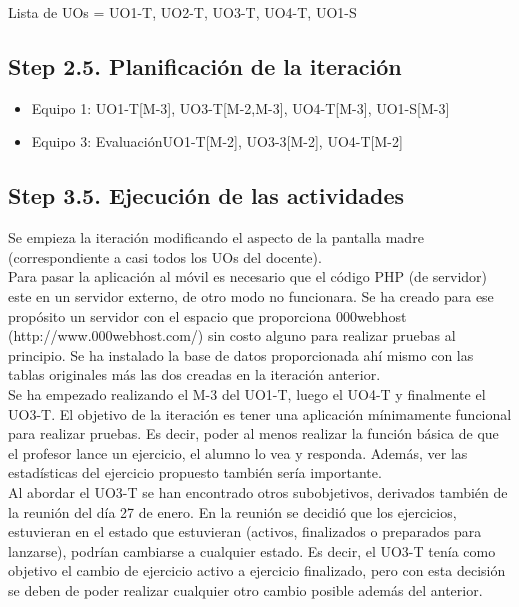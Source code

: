 Lista de UOs = {UO1-T, UO2-T, UO3-T, UO4-T, UO1-S}

\subsection{Step 2.5. Planificación de la iteración}
\label{it5:2.5}

\begin{itemize}
\item Equipo 1: UO1-T[M-3], UO3-T[M-2,M-3], UO4-T[M-3], UO1-S[M-3]
\item Equipo 3: Evaluación{UO1-T[M-2], UO3-3[M-2], UO4-T[M-2]}
\end{itemize}

\subsection{Step 3.5. Ejecución de las actividades}
\label{it5:3.5}

Se empieza la iteración modificando el aspecto de la pantalla madre (correspondiente a casi todos los UOs del docente).\\

Para pasar la aplicación al móvil es necesario que el código PHP (de servidor) este en un servidor externo, de otro modo no funcionara. Se ha creado para ese propósito un servidor con el espacio que proporciona 000webhost (http://www.000webhost.com/) sin costo alguno para realizar pruebas al principio. Se ha instalado la base de datos proporcionada ahí mismo con las tablas originales más las dos creadas en la iteración anterior.\\

Se ha empezado realizando el M-3 del UO1-T, luego el UO4-T y finalmente el UO3-T. El objetivo de la iteración es tener una aplicación mínimamente funcional para realizar pruebas. Es decir, poder al menos realizar la función básica de que el profesor lance un ejercicio, el alumno lo vea y responda. Además, ver las estadísticas del ejercicio propuesto también sería importante.\\

Al abordar el UO3-T se han encontrado otros subobjetivos, derivados también de la reunión del día 27 de enero. En la reunión se decidió que los ejercicios, estuvieran en el estado que estuvieran (activos, finalizados o preparados para lanzarse), podrían cambiarse a cualquier estado. Es decir, el UO3-T tenía como objetivo el cambio de ejercicio activo a ejercicio finalizado, pero con esta decisión se deben de poder realizar cualquier otro cambio posible además del anterior.\\

